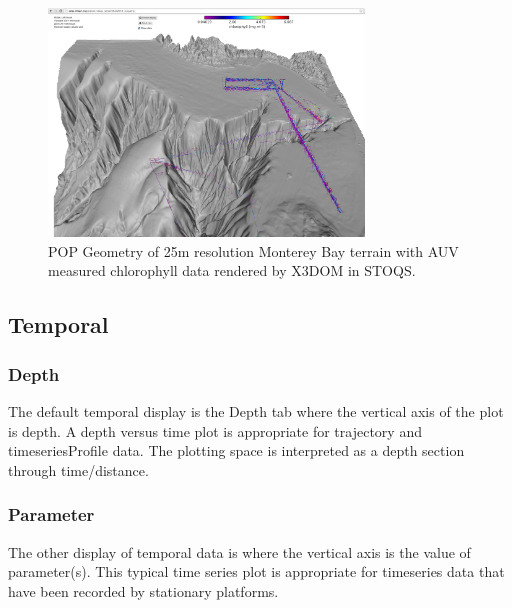 \documentclass[conference]{IEEEtran}
\begin{document}
\begin{figure}[htbp]
\centering
\includegraphics[width=3.3in]{Monterey25_lrauvs.png}
\caption{POP Geometry of 25m resolution Monterey Bay terrain with AUV measured chlorophyll data rendered by X3DOM in STOQS.}
\label{fig:Monterey25_lrauvs}
\end{figure}


\subsection{Temporal}

\subsubsection{Depth}
The default temporal display is the Depth tab where the vertical axis of the plot is depth. A depth versus time plot is appropriate for trajectory and timeseriesProfile data. The plotting space is interpreted as a depth section through time/distance. 

\subsubsection{Parameter}
The other display of temporal data is where the vertical axis is the value of parameter(s). This typical time series plot is appropriate for timeseries data that have been recorded by stationary platforms. 









\end{document}
